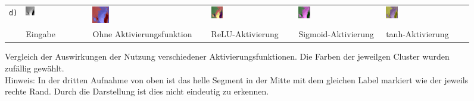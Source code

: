 \begin{figure}[h!]
\begin{tabular}{m{15pt}m{}m{}m{}m{}m{}}
		\texttt{d)} &
		\includegraphics[width=0.15\textwidth]{images/p03/p03_04.png} &
		\includegraphics[width=0.15\textwidth]{images/gen/activation_functions/p03_04.png_None.png} &
		\includegraphics[width=0.15\textwidth]{images/gen/activation_functions/p03_04.png_relu.png} &
		\includegraphics[width=0.15\textwidth]{images/gen/activation_functions/p03_04.png_sigmoid.png} &
		\includegraphics[width=0.15\textwidth]{images/gen/activation_functions/p03_04.png_tanh.png} \\
		
		&
		\vspace*{2pt}\centering Eingabe & 
		\vspace*{2pt}\centering Ohne Aktivierungsfunktion &
		\vspace*{2pt}\centering ReLU-Aktivierung &
		\vspace*{2pt}\centering Sigmoid-Aktivierung &
		\vspace*{2pt}\centering tanh-Aktivierung 
	\end{tabular}
	\caption{Vergleich der Auswirkungen der Nutzung verschiedener Aktivierungsfunktionen. Die Farben der jeweilgen Cluster wurden zufällig gewählt.\\
		Hinweis: In der dritten Aufnahme von oben ist das helle Segment in der Mitte mit dem gleichen Label markiert wie der jeweils rechte Rand. Durch die Darstellung ist dies nicht eindeutig zu erkennen.}
	\label{fig:activation_comparision}
\end{figure}

